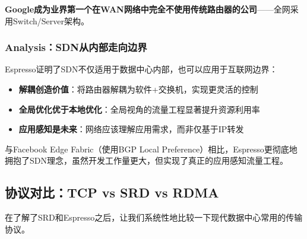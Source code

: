 \textbf{Google成为业界第一个在WAN网络中完全不使用传统路由器的公司}——全网采用Switch/Server架构。

\subsubsection{Analysis：SDN从内部走向边界}

Espresso证明了SDN不仅适用于数据中心内部，也可以应用于互联网边界：

\begin{itemize}
    \item \textbf{解耦创造价值}：将路由器解耦为软件+交换机，实现更灵活的控制
    \item \textbf{全局优化优于本地优化}：全局视角的流量工程显著提升资源利用率
    \item \textbf{应用感知是未来}：网络应该理解应用需求，而非仅基于IP转发
\end{itemize}

与Facebook Edge Fabric（使用BGP Local Preference）相比，Espresso更彻底地拥抱了SDN理念，虽然开发工作量更大，但实现了真正的应用感知流量工程。

\subsection{协议对比：TCP vs SRD vs RDMA}

在了解了SRD和Espresso之后，让我们系统性地比较一下现代数据中心常用的传输协议。

